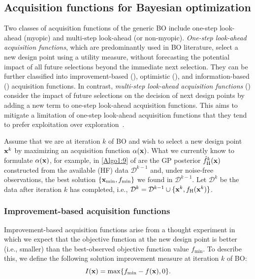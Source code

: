 \documentclass[journal ]{new-aiaa}
\begin{document}
\subsection{Acquisition functions for Bayesian optimization}\label{Sec51}

Two classes of acquisition functions of the generic BO include one-step look-ahead (myopic) and multi-step look-ahead (or non-myopic).
\textit{One-step look-ahead acquisition functions}, which are predominantly used in BO literature, select a new design point using a utility measure, without forecasting the potential impact of all future selections beyond the immediate next selection.
They can be further classified into improvement-based (), optimistic (), and  information-based () acquisition functions.
In contrast, \textit{multi-step look-ahead acquisition functions} () consider the impact of future selections on the decision of next design points by adding a new term to one-step look-ahead acquisition functions.
This aims to mitigate a limitation of one-step look-ahead acquisition functions that they tend to prefer exploitation over exploration~\citep{Hennig2022}.

Assume that we are at iteration $k$ of BO and wish to select a new design point ${\bf x}^{k}$ by maximizing an acquisition function $\alpha({\bf x})$.
What we currently know to formulate $\alpha({\bf x})$, for example, in \cref{Algo1:9} of  are the GP posterior $\hat{f}_\text{H}^k({\bf x})$ constructed from the available (HF) data $\mathcal{D}^{k-1}$ and, under noise-free observations, the best solution $\{{\bf x}_{\min}, f_{\min}\}$ we found in $\mathcal{D}^{k-1}$.
Let $\mathcal{D}^{k}$ be the data after iteration $k$ has completed, i.e., $\mathcal{D}^{k} = \mathcal{D}^{k-1} \cup \{{\bf x}^{k},f_\text{H}({\bf x}^{k})\}$.

\subsubsection{Improvement-based acquisition functions}\label{Sec511}

Improvement-based acquisition functions arise from a thought experiment in which we expect that the objective function at the new design point is better (i.e., smaller) than the best-observed objective function value $f_\text{min}$.
To describe this, we define the following solution improvement measure at iteration $k$ of BO:
\begin{equation}\label{eqn37}
	I({\bf x}) = \max\{f_\text{min}-f({\bf x}),0\}.
\end{equation}
\end{document}
